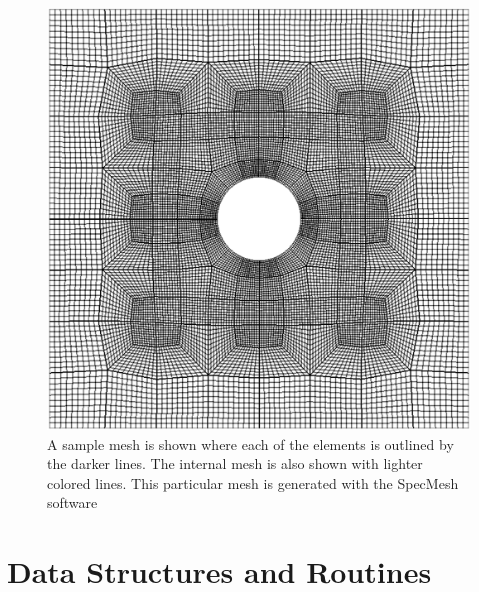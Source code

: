 \documentclass[12pt]{softwaremanual}
\begin{document}
\begin{figure}[h!]
\begin{center}
\includegraphics[scale=0.5]{figures/geometry/sample2dmesh.png}
\caption{A sample mesh is shown where each of the elements is outlined by the darker lines. The internal mesh is also shown with lighter colored lines. This particular mesh is generated with the SpecMesh software \citep{KoprivaSpecMesh} } \label{fig:samplemesh}
\end{center}
\end{figure}


\section{Data Structures and Routines}

  
\pagebreak


\end{document}
